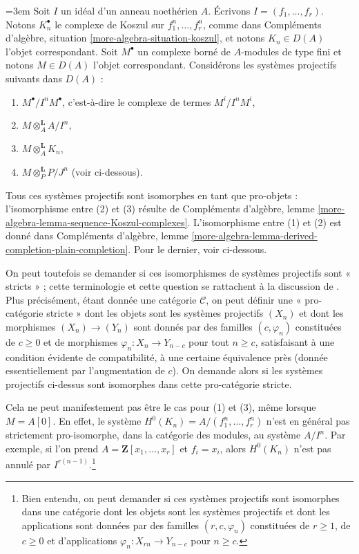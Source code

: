 \begin{remark}
\label{remark-strict-pro-isomorphism}
{\emergencystretch=3em
Soit $I$ un idéal d'un anneau noethérien $A$. Écrivons $I = (f_1, \ldots, f_r)$. Notons $K_n^\bullet$ le complexe de Koszul sur $f_1^n, \ldots, f_r^n$, comme dans Compléments d'algèbre, situation \ref{more-algebra-situation-koszul}, et notons $K_n \in D(A)$ l'objet correspondant. Soit $M^\bullet$ un complexe borné de $A$-modules de type fini et notons $M \in D(A)$ l'objet correspondant. Considérons les systèmes projectifs suivants dans $D(A)$ :
\par}
\begin{enumerate}
\item $M^\bullet/I^nM^\bullet$, c'est-à-dire le complexe de termes $M^i/I^nM^i$,
\item $M \otimes_A^\mathbf{L} A/I^n$,
\item $M \otimes_A^\mathbf{L} K_n$,
\item $M \otimes_P^\mathbf{L} P/J^n$ (voir ci-dessous).
\end{enumerate}
Tous ces systèmes projectifs sont isomorphes en tant que pro-objets : l'isomorphisme entre (2) et (3) résulte de Compléments d'algèbre, lemme \ref{more-algebra-lemma-sequence-Koszul-complexes}. L'isomorphisme entre (1) et (2) est donné dans Compléments d'algèbre, lemme \ref{more-algebra-lemma-derived-completion-plain-completion}. Pour le dernier, voir ci-dessous.

\medskip\noindent
On peut toutefois se demander si ces isomorphismes de systèmes projectifs sont « stricts » ; cette terminologie et cette question se rattachent à la discussion de \cite[pages 61, 62]{quillenhomology}. Plus précisément, étant donnée une catégorie $\mathcal{C}$, on peut définir une « pro-catégorie stricte » dont les objets sont les systèmes projectifs $(X_n)$ et dont les morphismes $(X_n) \to (Y_n)$ sont donnés par des familles $(c, \varphi_n)$ constituées de $c \geq 0$ et de morphismes $\varphi_n : X_n \to Y_{n - c}$ pour tout $n \geq c$, satisfaisant à une condition évidente de compatibilité, à une certaine équivalence près (donnée essentiellement par l'augmentation de $c$). On demande alors si les systèmes projectifs ci-dessus sont isomorphes dans cette pro-catégorie stricte.

\medskip\noindent
Cela ne peut manifestement pas être le cas pour (1) et (3), même lorsque $M = A[0]$. En effet, le système $H^0(K_n) = A/(f_1^n, \ldots, f_r^n)$ n'est en général pas strictement pro-isomorphe, dans la catégorie des modules, au système $A/I^n$. Par exemple, si l'on prend $A = \mathbf{Z}[x_1, \ldots, x_r]$ et $f_i = x_i$, alors $H^0(K_n)$ n'est pas annulé par $I^{r(n - 1)}$.\footnote{Bien entendu, on peut demander si ces systèmes projectifs sont isomorphes dans une catégorie dont les objets sont les systèmes projectifs et dont les applications sont données par des familles $(r, c, \varphi_n)$ constituées de $r \geq 1$, de $c \geq 0$ et d'applications $\varphi_n : X_{rn} \to Y_{n - c}$ pour $n \geq c$.}


\end{remark}
